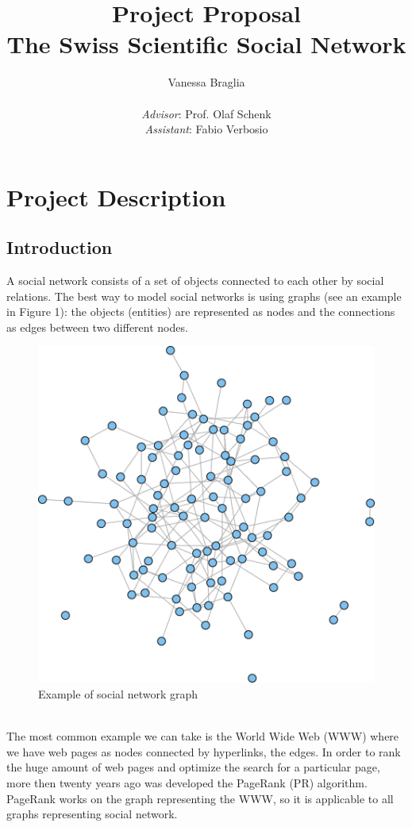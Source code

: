 \documentclass[12 pt]{article}
\author{Vanessa Braglia \\ \\ \textit{Advisor}: Prof. Olaf Schenk \\ \textit{Assistant}: Fabio Verbosio}
\title{\textbf{Project Proposal} \\ The Swiss Scientific Social Network}
\begin{document}
\maketitle 
\newpage
\section*{Project Description}
\subsection*{Introduction}
A social network consists of a set of objects connected to each other by social relations. The best way to model social networks is using graphs (see an example in Figure 1): the objects (entities) are represented as nodes and the connections as edges between two different nodes. \\
\begin{figure} [h!]
\centering 
\includegraphics[scale=0.5]{graph.png}
\caption{Example of social network graph}
\end{figure}
\\
The most common example we can take is the World Wide Web (WWW) where we have web pages as nodes connected by hyperlinks, the edges. In order to rank the huge amount of web pages and optimize the search for a particular page, more then twenty years ago was developed the PageRank (PR) algorithm. PageRank works on the graph representing the WWW, so it is applicable to all graphs representing social network.
\end{document}
